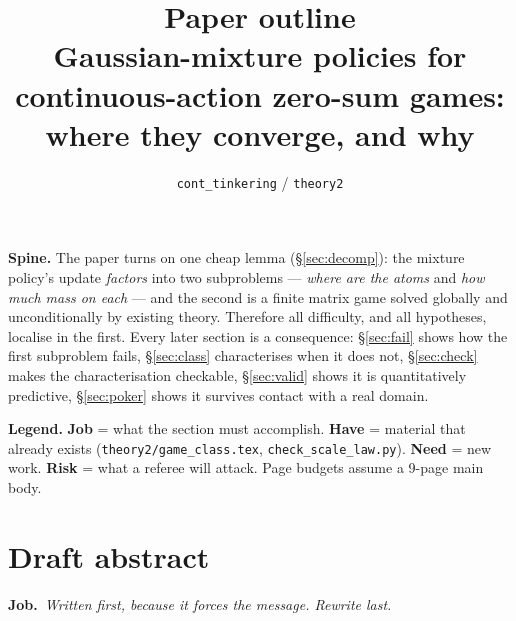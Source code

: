 \documentclass[11pt]{article}
\title{Paper outline\\
\large Gaussian-mixture policies for continuous-action zero-sum games:\\
where they converge, and why}
\author{\texttt{cont\_tinkering} / \texttt{theory2}}
\date{}
\newcommand{\job}[1]{\par\smallskip\noindent
  \textcolor{jobc}{\textbf{Job.}}\ \emph{#1}\par\smallskip}
\theoremstyle{definition}
\theoremstyle{remark}
\begin{document}
\maketitle

\begin{center}
\end{center}

\bigskip
\noindent
\textbf{Spine.} The paper turns on one cheap lemma (\S\ref{sec:decomp}): the
mixture policy's update \emph{factors} into two subproblems --- \emph{where are
the atoms} and \emph{how much mass on each} --- and the second is a finite matrix
game solved globally and unconditionally by existing theory. Therefore all
difficulty, and all hypotheses, localise in the first. Every later section is a
consequence: \S\ref{sec:fail} shows how the first subproblem fails,
\S\ref{sec:class} characterises when it does not, \S\ref{sec:check} makes the
characterisation checkable, \S\ref{sec:valid} shows it is quantitatively
predictive, \S\ref{sec:poker} shows it survives contact with a real domain.

\medskip
\noindent
\textbf{Legend.} \textcolor{jobc}{\textbf{Job}} = what the section must
accomplish. \textcolor{havec}{\textbf{Have}} = material that already exists
(\texttt{theory2/game\_class.tex}, \texttt{check\_scale\_law.py}).
\textcolor{needc}{\textbf{Need}} = new work.
\textcolor{riskc}{\textbf{Risk}} = what a referee will attack.
Page budgets assume a 9-page main body.

\tableofcontents

\section*{Draft abstract}
\job{Written first, because it forces the message. Rewrite last.}
\end{document}

